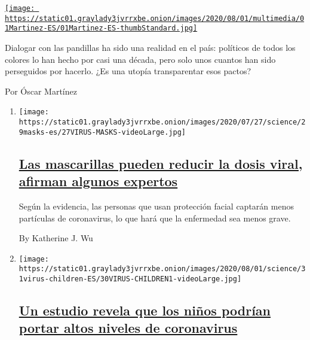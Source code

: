 \begin{enumerate}
\begin{enumerate}
    \href{/es/2020/08/02/espanol/opinion/pandillas-el-salvador.html}{\texttt{[image: https://static01.graylady3jvrrxbe.onion/images/2020/08/01/multimedia/01Martinez-ES/01Martinez-ES-thumbStandard.jpg]}}

    Dialogar con las pandillas ha sido una realidad en el país:
    políticos de todos los colores lo han hecho por casi una década,
    pero solo unos cuantos han sido perseguidos por hacerlo. ¿Es una
    utopía transparentar esos pactos?

    Por Óscar Martínez
  \end{enumerate}
\end{enumerate}

\begin{enumerate}
\def\labelenumi{\arabic{enumi}.}
\item
  \texttt{[image: https://static01.graylady3jvrrxbe.onion/images/2020/07/27/science/29masks-es/27VIRUS-MASKS-videoLarge.jpg]}

  \hypertarget{las-mascarillas-pueden-reducir-la-dosis-viral-afirman-algunos-expertos}{%
  \subsection{\texorpdfstring{\href{/es/2020/07/29/espanol/ciencia-y-tecnologia/proteccion-cubrebocas-coronavirus.html}{Las
  mascarillas pueden reducir la dosis viral, afirman algunos
  expertos}}{Las mascarillas pueden reducir la dosis viral, afirman algunos expertos}}\label{las-mascarillas-pueden-reducir-la-dosis-viral-afirman-algunos-expertos}}

  Según la evidencia, las personas que usan protección facial captarán
  menos partículas de coronavirus, lo que hará que la enfermedad sea
  menos grave.

  By Katherine J. Wu
\item
  \texttt{[image: https://static01.graylady3jvrrxbe.onion/images/2020/08/01/science/31virus-children-ES/30VIRUS-CHILDREN1-videoLarge.jpg]}

  \hypertarget{un-estudio-revela-que-los-niuxf1os-podruxedan-portar-altos-niveles-de-coronavirus}{%
  \subsection{\texorpdfstring{\href{/es/2020/07/31/espanol/ciencia-y-tecnologia/ninos-contagio-coronavirus.html}{Un
  estudio revela que los niños podrían portar altos niveles de
  coronavirus}}{Un estudio revela que los niños podrían portar altos niveles de coronavirus}}\label{un-estudio-revela-que-los-niuxf1os-podruxedan-portar-altos-niveles-de-coronavirus}}


\end{enumerate}

